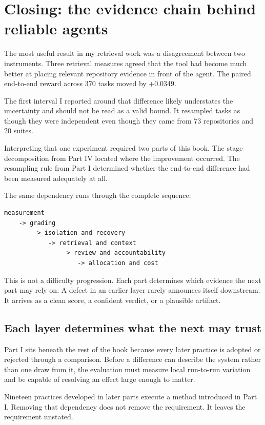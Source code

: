 \chapter{Closing: the evidence chain behind reliable agents}
\label{closing-evidence-chain}
The most useful result in my retrieval work was a disagreement between two instruments. Three retrieval measures agreed that the tool had become much better at placing relevant repository evidence in front of the agent. The paired end-to-end reward across 370 tasks moved by +0.0349.

The first interval I reported around that difference likely understates the uncertainty and should not be read as a valid bound. It resampled tasks as though they were independent even though they came from 73 repositories and 20 suites.

Interpreting that one experiment required two parts of this book. The stage decomposition from Part IV located where the improvement occurred. The resampling rule from Part I determined whether the end-to-end difference had been measured adequately at all.

The same dependency runs through the complete sequence:

\begin{verbatim}
measurement
    -> grading
        -> isolation and recovery
            -> retrieval and context
                -> review and accountability
                    -> allocation and cost
\end{verbatim}

This is not a difficulty progression. Each part determines which evidence the next part may rely on. A defect in an earlier layer rarely announces itself downstream. It arrives as a clean score, a confident verdict, or a plausible artifact.

\section{Each layer determines what the next may trust}\label{each-layer-determines-what-the-next-may-trust}

Part I sits beneath the rest of the book because every later practice is adopted or rejected through a comparison. Before a difference can describe the system rather than one draw from it, the evaluation must measure local run-to-run variation and be capable of resolving an effect large enough to matter.

Nineteen practices developed in later parts execute a method introduced in Part I. Removing that dependency does not remove the requirement. It leaves the requirement unstated.

